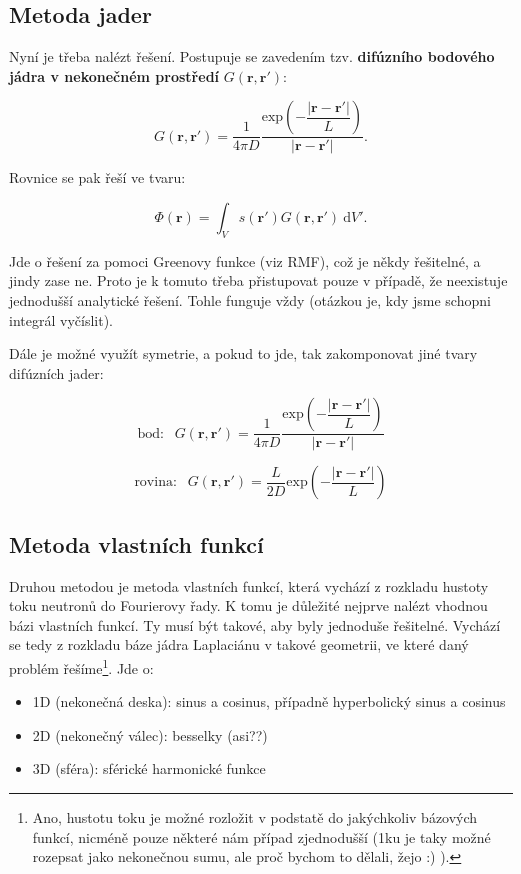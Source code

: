\subsection{Metoda jader}

Nyní je třeba nalézt řešení. Postupuje se zavedením tzv. \textbf{difúzního bodového jádra v nekonečném prostředí} $G(\textbf{r},\textbf{r}')$:

$$ \boxed{G(\textbf{r},\textbf{r}') = \dfrac{1}{4 \pi D} \dfrac{\text{exp} \left(- \dfrac{|\textbf{r}-\textbf{r}'|}{L}\right)}{|\textbf{r}-\textbf{r}'|}}. $$

Rovnice se pak řeší ve tvaru:

$$ \boxed{\Phi(\textbf{r}) = \int_V s(\textbf{r}')G(\textbf{r},\textbf{r}') \: \text{d}V'.} $$

Jde o řešení za pomoci Greenovy funkce (viz RMF), což je někdy řešitelné, a jindy zase ne. Proto je k tomuto třeba přistupovat pouze v případě, že neexistuje jednodušší analytické řešení. Tohle funguje vždy (otázkou je, kdy jsme schopni integrál vyčíslit).

Dále je možné využít symetrie, a pokud to jde, tak zakomponovat jiné tvary difúzních jader:

$$\text{bod:   } \: \: \boxed{G(\textbf{r},\textbf{r}') = \dfrac{1}{4 \pi D} \dfrac{\text{exp} \left(- \dfrac{|\textbf{r}-\textbf{r}'|}{L}\right)}{|\textbf{r}-\textbf{r}'|}} $$

$$\text{rovina:   } \: \: \boxed{G(\textbf{r},\textbf{r}') = \dfrac{L}{2 D} \text{exp} \left(- \dfrac{|\textbf{r}-\textbf{r}'|}{L}\right)} $$

\subsection{Metoda vlastních funkcí}

Druhou metodou je metoda vlastních funkcí, která vychází z rozkladu hustoty toku neutronů do Fourierovy řady. K tomu je důležité nejprve nalézt vhodnou bázi vlastních funkcí. Ty musí být takové, aby byly jednoduše řešitelné. Vychází se tedy z rozkladu báze jádra Laplaciánu v takové geometrii, ve které daný problém řešíme\footnote{Ano, hustotu toku je možné rozložit v podstatě do jakýchkoliv bázových funkcí, nicméně pouze některé nám případ zjednodušší (1ku je taky možné rozepsat jako nekonečnou sumu, ale proč bychom to dělali, žejo :) ).}. Jde o:

\begin{itemize}
    \item 1D (nekonečná deska): sinus a cosinus, případně hyperbolický sinus a cosinus
    \item 2D (nekonečný válec): besselky (asi??)
    \item 3D (sféra): sférické harmonické funkce
\end{itemize}

